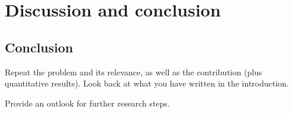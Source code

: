 \chapter{Discussion and conclusion}
\label{ch:discussion-conclusion}



\section{Conclusion}
\label{sec:conclusion}

Repeat the problem and its relevance, as well as the contribution (plus quantitative results). 
Look back at what you have written in the introduction.

Provide an outlook for further research steps.